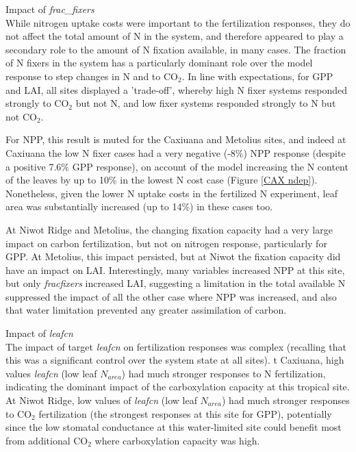 \documentclass[draft,linenumbers]{agujournal}
\begin{document}
Impact of \emph{frac\_fixers}\\
While nitrogen uptake costs were important to the fertilization responses, they do not affect the total amount of N in the system, and therefore appeared to play a secondary role to the amount of N fixation available, in many cases.  The fraction of N fixers in the system has a particularly dominant role over the model response to step changes in N and to CO$_{2}$. In line with expectations, for GPP and LAI, all sites displayed a 'trade-off', whereby high N fixer systems responded strongly to CO$_{2}$ but not N, and low fixer systems responded strongly to N but not CO$_{2}$. 

For NPP, this result is muted for the Caxiuana and Metolius sites, and indeed at Caxiuana the low N fixer cases had a very negative (-8\%) NPP response (despite a positive 7.6\% GPP response), on account of the model increasing the N content of the leaves by up to 10\% in the lowest N cost case (Figure \ref{CAX ndep}). Nonetheless, given the lower N uptake costs in the fertilized N experiment, leaf area was substantially increased (up to 14\%) in these cases too. 

At Niwot Ridge and Metolius, the changing fixation capacity had a very large impact on carbon fertilization, but not on nitrogen response, particularly for GPP. At Metolius, this impact persisted, but at Niwot the fixation capacity did have an impact on LAI. Interestingly, many variables increased NPP at this site, but only \emph{fracfixers} increased LAI, suggesting a limitation in the total available N suppressed the impact of all the other case where NPP was increased, and also that water limitation prevented any greater assimilation of carbon. 


Impact of \emph{leafcn}\\
The impact of target \emph{leafcn} on fertilization responses was complex (recalling that this was a significant control over the system state at all sites). t Caxiuana, high values \emph{leafcn} (low leaf  $N_{area}$) had much stronger responses to N fertilization, indicating the dominant impact of the carboxylation capacity at this tropical site.  At Niwot Ridge, low values of \emph{leafcn} (low leaf  $N_{area}$) had much stronger responses to CO$_{2}$ fertilization (the strongest responses at this site for GPP), potentially since the low stomatal conductance at this water-limited site could benefit most from additional CO$_{2}$ where carboxylation capacity was high. 
\end{document}
